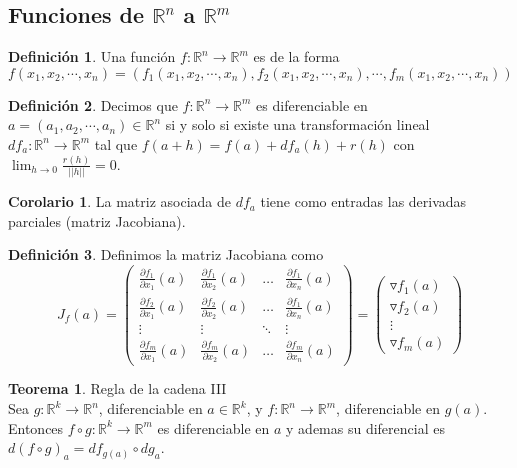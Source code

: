 \documentclass[10pt]{article}
\theoremstyle{definition}
\newtheorem{definition}{Definición}[section]
\newtheorem{theorem}{Teorema}[section]
\newtheorem{corollary}{Corolario}[theorem]
\begin{document}
\subsection{Funciones de $\mathbb{R}^n$ a $\mathbb{R}^m$}
\begin{definition}
    Una función $f:\mathbb{R}^n\to\mathbb{R}^m$ es de la forma $$f(x_1,x_2,\cdots,x_n)=(f_1(x_1,x_2,\cdots,x_n),f_2(x_1,x_2,\cdots,x_n),\cdots,f_m(x_1,x_2,\cdots,x_n))$$
\end{definition}
\begin{definition}
    Decimos que $f:\mathbb{R}^n\to\mathbb{R}^m$ es diferenciable en $a=(a_1,a_2,\cdots,a_n)\in\mathbb{R}^n$ si y solo si existe una transformación lineal $df_a:\mathbb{R}^n\to\mathbb{R}^m$ tal que $f(a+h)=f(a)+df_a(h)+r(h)$ con $\lim_{h \to 0}\frac{r(h)}{||h||}=0$.
\end{definition}
\begin{corollary}
    La matriz asociada de $df_a$ tiene como entradas las derivadas parciales (matriz Jacobiana).
\end{corollary}
\begin{definition}
    Definimos la matriz Jacobiana como $$J_f(a)=\begin{pmatrix}
\frac{\partial f_{1}}{\partial x_{1}}( a) & \frac{\partial f_{1}}{\partial x_{2}}( a) & \dotsc  & \frac{\partial f_{1}}{\partial x_{n}}( a)\\
\frac{\partial f_{2}}{\partial x_{1}}( a) & \frac{\partial f_{2}}{\partial x_{2}}( a) & \dotsc  & \frac{\partial f_{1}}{\partial x_{n}}( a)\\
\vdots  & \vdots  & \ddots  & \vdots \\
\frac{\partial f_{m}}{\partial x_{1}}( a) & \frac{\partial f_{m}}{\partial x_{2}}( a) & \dotsc  & \frac{\partial f_{m}}{\partial x_{n}}( a)
\end{pmatrix}=\begin{pmatrix}
\triangledown f_{1}( a)\\
\triangledown f_{2}( a)\\
\vdots \\
\triangledown f_{m}( a)
\end{pmatrix}$$
\end{definition}
\begin{theorem}{Regla de la cadena III}
    \\Sea $g:\mathbb{R}^k\to\mathbb{R}^n$, diferenciable en $a\in\mathbb{R}^k$, y $f:\mathbb{R}^n\to\mathbb{R}^m$, diferenciable en $g(a)$. Entonces $f\circ g:\mathbb{R}^k\to\mathbb{R}^m$ es diferenciable en $a$ y ademas su diferencial es $d(f\circ g)_a=df_{g(a)}\circ dg_a$.
\end{theorem}
\end{document}
